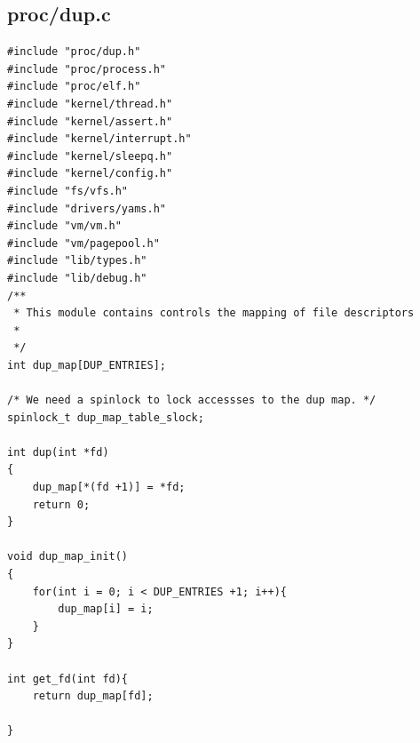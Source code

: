 \documentclass[a4paper,12pt,danish]{report}
\begin{document}
\subsection{proc/dup.c}
\begin{verbatim}
#include "proc/dup.h"
#include "proc/process.h"
#include "proc/elf.h"
#include "kernel/thread.h"
#include "kernel/assert.h"
#include "kernel/interrupt.h"
#include "kernel/sleepq.h"
#include "kernel/config.h"
#include "fs/vfs.h"
#include "drivers/yams.h"
#include "vm/vm.h"
#include "vm/pagepool.h"
#include "lib/types.h"
#include "lib/debug.h"
/**
 * This module contains controls the mapping of file descriptors
 *
 */
int dup_map[DUP_ENTRIES];

/* We need a spinlock to lock accessses to the dup map. */
spinlock_t dup_map_table_slock;

int dup(int *fd)
{
    dup_map[*(fd +1)] = *fd;
    return 0;
}

void dup_map_init()
{
    for(int i = 0; i < DUP_ENTRIES +1; i++){
        dup_map[i] = i;
    }
}

int get_fd(int fd){
    return dup_map[fd];

}


\end{verbatim}
\end{document}
